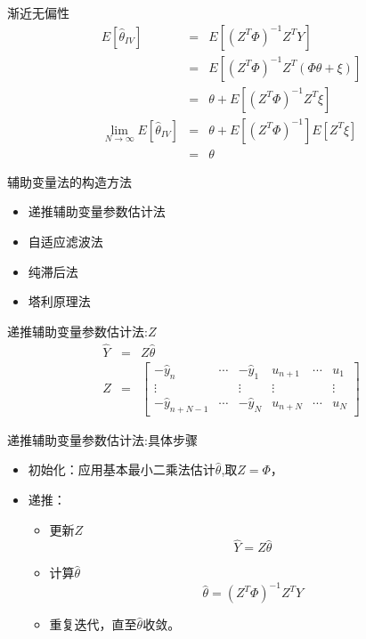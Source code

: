 \begin{frame}{渐近无偏性}
\begin{eqnarray*}
E[\hat\theta_{IV}] &=& E[(Z^T\Phi)^{-1}Z^T Y] \\
&=& E[(Z^T\Phi)^{-1}Z^T (\Phi\theta +\xi)] \\
&=& \theta+E[(Z^T\Phi)^{-1}Z^T \xi] \\
\lim_{N\to\infty}E[\hat\theta_{IV}] &=& \theta+ E[(Z^T\Phi)^{-1}]E[Z^T \xi] \\
&=& \theta 
\end{eqnarray*}
\end{frame}

\begin{frame}{辅助变量法的构造方法}
\begin{itemize}
\item 递推辅助变量参数估计法 
\item 自适应滤波法
\item 纯滞后法 
\item 塔利原理法
\end{itemize}
\end{frame}

\begin{frame}{递推辅助变量参数估计法:$Z$}
\begin{eqnarray*}
\hat Y &=& Z \hat\theta  \\
Z &=& \begin{bmatrix}
-\hat y_n   & \cdots &  -\hat y_1  & u_{n+1} & \cdots & u_1 \\
\vdots      &        & \vdots      & \vdots  &        & \vdots \\
-\hat y_{n+N-1}   & \cdots &  -\hat y_N  & u_{n+N} & \cdots & u_N 
\end{bmatrix}
\end{eqnarray*}
\end{frame}

\begin{frame}{递推辅助变量参数估计法:具体步骤}
\begin{itemize}
\item 初始化：应用基本最小二乘法估计$\hat\theta$,取$Z=\Phi$，
\item 递推：
\begin{itemize}
\item 更新$Z$
$$\hat Y=Z\hat\theta$$
\item 计算$\hat\theta$
$$\hat\theta = (Z^T\Phi)^{-1}Z^T Y$$
\item 重复迭代，直至$\hat\theta$收敛。
\end{itemize}
\end{itemize}
\end{frame}

